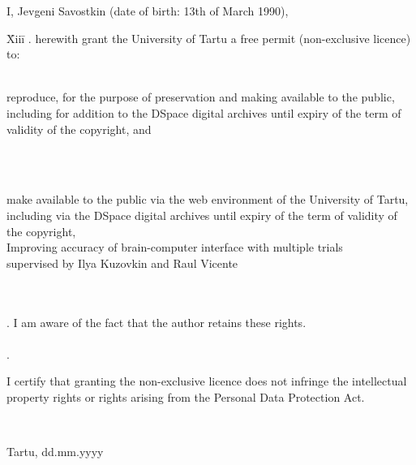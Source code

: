 \documentclass[12pt]{article}
\begin{document}
I, Jevgeni Savostkin (date of birth: 13th of March 1990),

\begin{tabbing}
\= Xiii\=\kill
{}. \> herewith grant the University of Tartu a free permit (non-exclusive licence) to:\\\\ 

\> 
\begin{minipage}[t]{14.2cm}
reproduce, for the purpose of preservation and making available to the public, including for addition to the DSpace digital archives until expiry of the term of validity of the copyright, and
\end{minipage}
\\\\
\begin{minipage}[t]{14.2cm}
make available to the public via the web environment of the University of Tartu, including via the DSpace digital archives until expiry of the term of validity of the copyright,\\ 

Improving accuracy of brain-computer interface with multiple trials\\   

supervised by Ilya Kuzovkin and Raul Vicente

\end{minipage}\\\\ 
. \>I am aware of the fact that the author retains these rights.\\\\
. \>
\begin{minipage}[t]{14.2cm}
I certify that granting the non-exclusive licence does not infringe the intellectual property rights or rights arising from the Personal Data Protection Act. 
\end{minipage}\\
\end{tabbing}

\noindent
Tartu, dd.mm.yyyy
\end{document}
